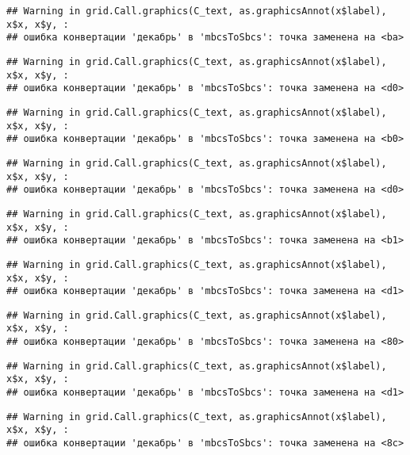 \documentclass[
]{article}
\begin{document}
\begin{verbatim}
## Warning in grid.Call.graphics(C_text, as.graphicsAnnot(x$label), x$x, x$y, :
## ошибка конвертации 'декабрь' в 'mbcsToSbcs': точка заменена на <ba>
\end{verbatim}

\begin{verbatim}
## Warning in grid.Call.graphics(C_text, as.graphicsAnnot(x$label), x$x, x$y, :
## ошибка конвертации 'декабрь' в 'mbcsToSbcs': точка заменена на <d0>
\end{verbatim}

\begin{verbatim}
## Warning in grid.Call.graphics(C_text, as.graphicsAnnot(x$label), x$x, x$y, :
## ошибка конвертации 'декабрь' в 'mbcsToSbcs': точка заменена на <b0>
\end{verbatim}

\begin{verbatim}
## Warning in grid.Call.graphics(C_text, as.graphicsAnnot(x$label), x$x, x$y, :
## ошибка конвертации 'декабрь' в 'mbcsToSbcs': точка заменена на <d0>
\end{verbatim}

\begin{verbatim}
## Warning in grid.Call.graphics(C_text, as.graphicsAnnot(x$label), x$x, x$y, :
## ошибка конвертации 'декабрь' в 'mbcsToSbcs': точка заменена на <b1>
\end{verbatim}

\begin{verbatim}
## Warning in grid.Call.graphics(C_text, as.graphicsAnnot(x$label), x$x, x$y, :
## ошибка конвертации 'декабрь' в 'mbcsToSbcs': точка заменена на <d1>
\end{verbatim}

\begin{verbatim}
## Warning in grid.Call.graphics(C_text, as.graphicsAnnot(x$label), x$x, x$y, :
## ошибка конвертации 'декабрь' в 'mbcsToSbcs': точка заменена на <80>
\end{verbatim}

\begin{verbatim}
## Warning in grid.Call.graphics(C_text, as.graphicsAnnot(x$label), x$x, x$y, :
## ошибка конвертации 'декабрь' в 'mbcsToSbcs': точка заменена на <d1>
\end{verbatim}

\begin{verbatim}
## Warning in grid.Call.graphics(C_text, as.graphicsAnnot(x$label), x$x, x$y, :
## ошибка конвертации 'декабрь' в 'mbcsToSbcs': точка заменена на <8c>
\end{verbatim}
\end{document}
